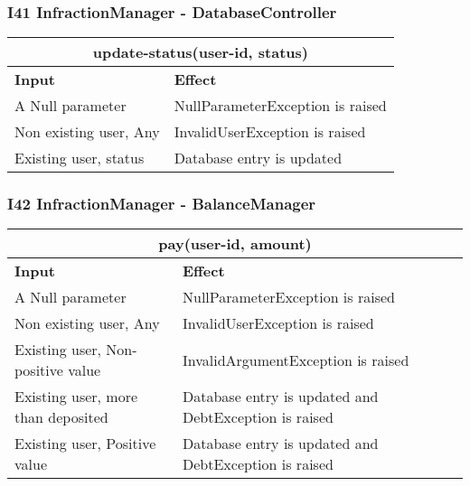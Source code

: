 \subsubsection{I41 InfractionManager - DatabaseController} 
\begin{tabular}{|p{5cm}|p{7cm}|}
\hline
\multicolumn{2}{|c|}{update-status(user-id, status)} \\
\hline
\textbf{Input} & \textbf{Effect} \\

\hline
A Null parameter & NullParameterException is raised \\

\hline
Non existing user, Any & InvalidUserException is raised \\

\hline
Existing user, status & Database entry is updated \\
\hline
\end{tabular}

\subsubsection{I42 InfractionManager - BalanceManager}
\begin{tabular}{|p{5cm}|p{7cm}|}
\hline
\multicolumn{2}{|c|}{pay(user-id, amount)} \\
\hline
\textbf{Input} & \textbf{Effect} \\

\hline
A Null parameter & NullParameterException is raised \\

\hline
Non existing user, Any & InvalidUserException is raised \\

\hline
Existing user, Non-positive value & InvalidArgumentException is raised \\

\hline
Existing user, more than deposited & Database entry is updated and DebtException is raised \\

\hline
Existing user, Positive value & Database entry is updated and DebtException is raised \\
\hline
\end{tabular}

